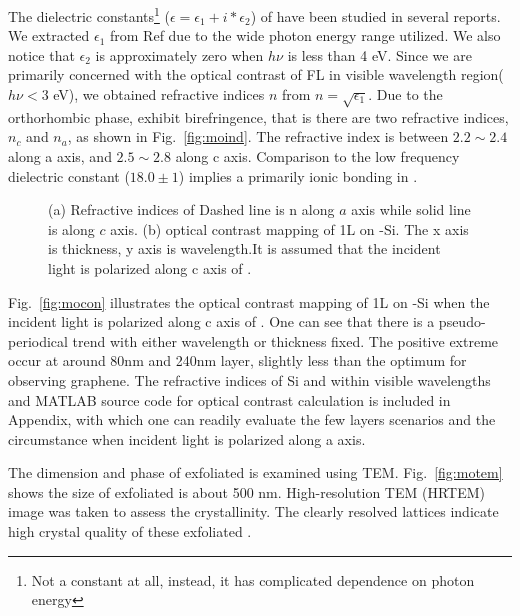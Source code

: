 The dielectric constants\footnote{Not a constant at all, instead, it has complicated dependence on photon energy} ($\epsilon = \epsilon_1 + i*\epsilon_2$) of  have been studied in several reports.\cite{Deb1968,Sabhapathi1995,Miyata1996,Abdellaoui1997,Mondragon1999} We extracted $\epsilon_1$ from Ref\cite{Itoh2001a} due to the wide photon energy range utilized. We also notice that $\epsilon_2$ is approximately zero when $h\nu$ is less than 4 eV. Since we are primarily concerned with the optical contrast of FL  in visible wavelength region($h\nu < 3$ eV), we obtained refractive indices $n$ from $n = \sqrt{\epsilon_1}$. Due to the orthorhombic phase,  exhibit birefringence, that is there are two refractive indices, $n_c$ and $n_a$, as shown in Fig.~\ref{fig:moind}. The refractive index is between $ 2.2\sim 2.4$ along a axis, and $ 2.5\sim 2.8$ along c axis. Comparison to the low frequency dielectric constant ($18.0\pm1$) implies a primarily ionic bonding in .\cite{He2003}

\begin{figure}[htb]
\centering
{}\hspace{0.04\textwidth}
\caption[Refractive indices of ]{(a) Refractive indices of  Dashed line is n along $a$ axis while solid line is along $c$ axis. (b) optical contrast mapping of 1L  on -Si. The x axis is  thickness, y axis is wavelength.It is assumed that the incident light is polarized along c axis of .}
\label{fig:mofl}
\end{figure}

Fig.~\ref{fig:mocon} illustrates the optical contrast mapping of 1L  on -Si when the incident light is polarized along c axis of . One can see that there is a pseudo-periodical trend with either wavelength or  thickness fixed. The positive extreme occur at around 80nm and 240nm  layer, slightly less than the optimum for observing graphene. The refractive indices of Si and  within visible wavelengths and MATLAB source code for optical contrast calculation is included in Appendix, with which one can readily evaluate the few layers  scenarios and the circumstance when incident light is polarized along a axis.

The dimension and phase of exfoliated  is examined using TEM. Fig.~\ref{fig:motem} shows the size of exfoliated  is about 500 nm. High-resolution TEM (HRTEM) image was taken to assess the  crystallinity. The clearly resolved lattices indicate high crystal quality of these exfoliated .

